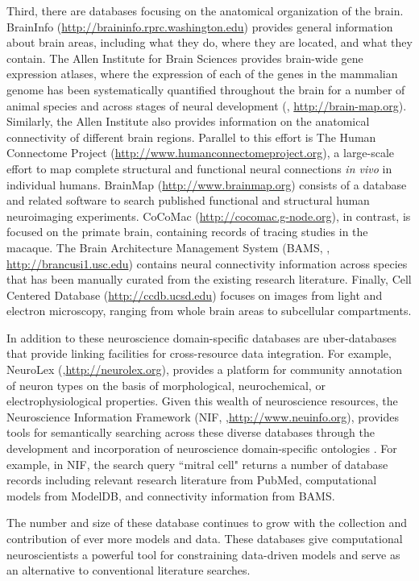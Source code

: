 \documentclass[12pt]{article}
\begin{document}
Third, there are databases focusing on the anatomical organization of the brain.  
BrainInfo (\url{http://braininfo.rprc.washington.edu}) provides general information about brain areas, including what they do, where they are located, and what they contain.  
The Allen Institute for Brain Sciences provides brain-wide gene expression atlases, where the expression of each of the genes in the mammalian genome has been systematically quantified throughout the brain for a number of animal species and across stages of neural development (\cite{lein_genome-wide_2007}, \url{http://brain-map.org}). 
Similarly, the Allen Institute also provides information on the anatomical connectivity of different brain regions.
Parallel to this effort is The Human Connectome Project (\url{http://www.humanconnectomeproject.org}), a large-scale effort to map complete structural and functional neural connections \textit{in vivo} in individual humans. 
BrainMap (\url{http://www.brainmap.org}) consists of a database and related software to search published functional and structural human neuroimaging experiments.  
CoCoMac (\url{http://cocomac.g-node.org}), in contrast, is focused on the primate brain, containing records of tracing studies in the macaque. 
The Brain Architecture Management System (BAMS, \cite{bota_brain_2005}, \url{http://brancusi1.usc.edu}) contains neural connectivity information across species that has been manually curated from the existing research literature.  
Finally, Cell Centered Database (\url{http://ccdb.ucsd.edu}) focuses on images from light and electron microscopy, ranging from whole brain areas to subcellular compartments.  

In addition to these neuroscience domain-specific databases are uber-databases that provide linking facilities for cross-resource data integration. 
For example, NeuroLex (\cite{larson_neurolex.org:_2013},\url{http://neurolex.org}), provides a platform for community annotation of neuron types on the basis of morphological, neurochemical, or electrophysiological properties. 
Given this wealth of neuroscience resources, the Neuroscience Information Framework (NIF, \cite{gardner_neuroscience_2008},\url{http://www.neuinfo.org}), provides tools for semantically searching across these diverse databases through the development and incorporation of neuroscience domain-specific ontologies \cite{bug_nifstd_2008,larson_ontologies_2009,hamilton_ontological_2012,imam_development_2012}. 
For example, in NIF, the search query ``mitral cell" returns a number of database records including relevant research literature from PubMed, computational models from ModelDB, and connectivity information from BAMS.  

The number and size of these database continues to grow with the collection and contribution of ever more models and data.  
These databases give computational neuroscientists a powerful tool for constraining data-driven models and serve as an alternative to conventional literature searches.  


\end{document}
